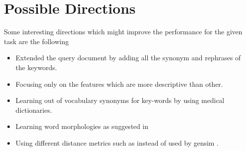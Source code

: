 \documentclass[12pt,a4paper] {article}
\begin{document}
\section*{Possible Directions}

Some interesting directions which might improve the performance for the given task are the following


\begin{itemize}
	\item Extended the query document by adding all the synonym and rephrases of the keywords. 
	\item Focusing only on the features which are more descriptive than other.
	\item Learning out of vocabulary synonyms for key-words by using medical dictionaries.
	\item Learning word morphologies as suggested in \cite{joulin2016bag}
	\item Using different distance metrics such as \cite{sidorov2014soft} \cite{kusner2015word} instead of \cite{annoy} used by gensim \cite{rehurek_lrec}.
	
	
\end{itemize}
\end{document}
